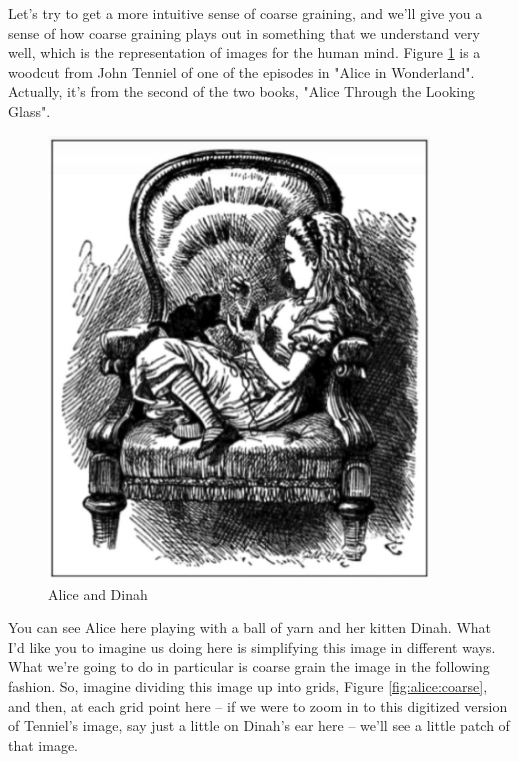 \documentclass[]{article}
\begin{document}
Let's try to get a more intuitive sense of coarse graining,
and we'll give you a sense of how coarse graining plays out
in something that we understand very well, which is the representation
of images for the human mind. Figure \ref{fig:alice1} is a woodcut from John Tenniel of one of the episodes in "Alice in Wonderland".
Actually, it's from the second of the two books, "Alice Through the Looking Glass".

\begin{figure}[H]
	\caption{Alice and Dinah}\label{fig:alice1}
	\includegraphics[width=0.9\textwidth]{Alice1}
\end{figure}
You can see Alice here playing with a ball of yarn and her kitten Dinah.
What I'd like you to imagine us doing here
is simplifying this image in different ways.
What we're going to do in particular is coarse grain the image
in the following fashion. So, imagine dividing
this image up into grids, Figure \ref{fig:alice:coarse}, and then, at each grid point here –
if we were to zoom in to this digitized
version of Tenniel's image,
say just a little on Dinah's ear here –
we'll see a little patch of that image.
\end{document}
